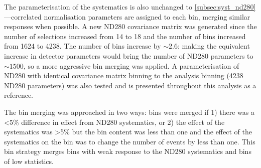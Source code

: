 The parameterisation of the systematics is also unchanged to \autoref{subsec:syst_nd280}---correlated normalisation parameters are assigned to each \pmu\cosmu bin, merging similar responses when possible. A new ND280 covariance matrix was generated since the number of selections increased from 14 to 18 and the number of bins increased from 1624 to 4238. The number of bins increase by $\sim2.6$: making the equivalent increase in detector parameters would bring the number of ND280 parameters to $\sim1500$, so a more aggressive bin merging was applied. A parameterisation of ND280 with identical covariance matrix binning to the analysis binning (4238 ND280 parameters) was also tested and is presented throughout this analysis as a reference.

The bin merging was approached in two ways: bins were merged if 1) there was a <5\% difference in effect from ND280 systematics, or 2) the effect of the systematics was >5\%  but the bin content was less than one and the effect of the systematics on the bin was to change the number of events by less than one. This bin strategy merges bins with weak response to the ND280 systematics and bins of low statistics. 

